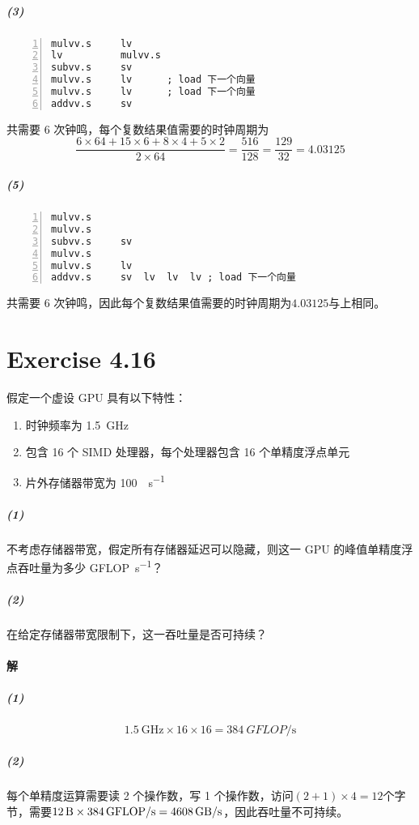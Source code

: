 \documentclass{article}
\begin{document}
\subparagraph{(3)}
\begin{lstlisting}[language={[x86masm]Assembler}, numbers = left, xleftmargin=.2\textwidth]
mulvv.s     lv
lv          mulvv.s
subvv.s     sv
mulvv.s     lv      ; load 下一个向量
mulvv.s     lv      ; load 下一个向量
addvv.s     sv
\end{lstlisting}
共需要 6 次钟鸣，每个复数结果值需要的时钟周期为
$$
    \frac{6 \times 64 + 15 \times 6 + 8 \times 4 + 5 \times 2}{2 \times 64} = \frac{516}{128} = \frac{129}{32} = 4.03125
$$
\subparagraph{(5)}
\begin{lstlisting}[language={[x86masm]Assembler}, numbers = left, xleftmargin=.2\textwidth]
mulvv.s
mulvv.s
subvv.s     sv
mulvv.s
mulvv.s     lv
addvv.s     sv  lv  lv  lv ; load 下一个向量
\end{lstlisting}
共需要 6 次钟鸣，因此每个复数结果值需要的时钟周期为$4.03125$与上相同。

\section{Exercise 4.16}
假定一个虚设 GPU 具有以下特性：
\begin{enumerate}[leftmargin = .1\linewidth, rightmargin = .1\linewidth, label=$\bullet$]
    \item 时钟频率为 \SI{1.5}{\giga\hertz}
    \item 包含 16 个 SIMD 处理器，每个处理器包含 16 个单精度浮点单元
    \item 片外存储器带宽为 \SI{100}{{\giga\byte}\per\second}
\end{enumerate}
\subparagraph{(1)} 不考虑存储器带宽，假定所有存储器延迟可以隐藏，则这一 GPU 的峰值单精度浮点吞吐量为多少 \si{GFLOP\per\second}？
\subparagraph{(2)} 在给定存储器带宽限制下，这一吞吐量是否可持续？
\paragraph{解}
\subparagraph{(1)}
$$
    \SI{1.5}{\giga\hertz} \times 16 \times 16 = \SI{384}{GFLOP\per\second}
$$
\subparagraph{(2)}
每个单精度运算需要读 2 个操作数，写 1 个操作数，访问$(2 + 1) \times 4 = 12$个字节，需要$\SI{12}{\byte} \times \SI{384}{GFLOP\per\second} = \SI{4608}{{\giga\byte}\per\second}$，因此吞吐量不可持续。
\end{document}
